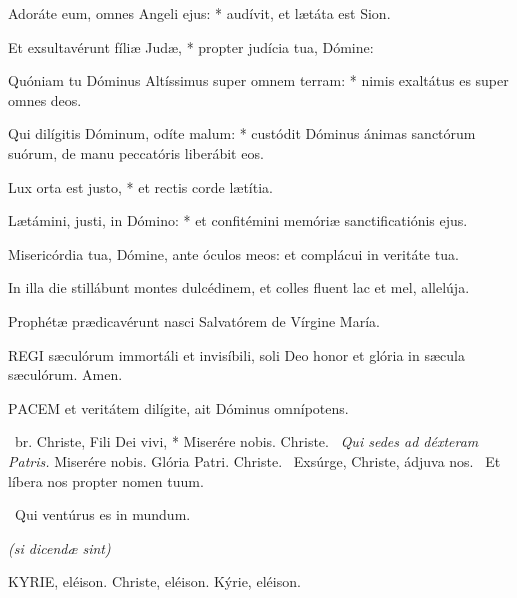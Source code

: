 Adoráte eum, omnes Angeli ejus: * audívit, et lætáta est Sion.

Et exsultavérunt fíliæ Judæ, * propter judícia tua, Dómine:

Quóniam tu Dóminus Altíssimus super omnem terram: * nimis exaltátus es super omnes deos.

Qui dilígitis Dóminum, odíte malum: * custódit Dóminus ánimas sanctórum suórum, de manu peccatóris liberábit eos.

Lux orta est justo, * et rectis corde lætítia.

Lætámini, justi, in Dómino: * et confitémini memóriæ sanctificatiónis ejus.


  Misericórdia tua, Dómine, ante óculos meos: et complácui in veritáte tua.


  In illa die stillábunt montes dulcédinem, et colles fluent lac et mel, allelúja.

  Prophétæ prædicavérunt nasci Salvatórem de Vírgine María.



\lettrine[lines=2]{R}{EGI} sæculórum immortáli et invisíbili, soli Deo honor et glória in sæcula sæculórum. Amen.



\lettrine[lines=2]{P}{ACEM} et veritátem dilígite, ait Dóminus omnípotens.

\R\ br. Christe, Fili Dei vivi, * Miserére nobis. Christe. \V\ \textit{Qui sedes ad déxteram Patris.} Miserére nobis. Glória Patri. Christe. \V\ Exsúrge, Christe, ádjuva nos. \R\ Et líbera nos propter nomen tuum.

 \V\ Qui ventúrus es in mundum.


\textit{(si dicendæ sint)}

KYRIE, eléison. Christe, eléison. Kýrie, eléison.

